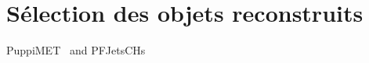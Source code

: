 \section{Sélection des objets reconstruits}\label{chapter-HTT_analysis-section-objects}

PuppiMET~\cite{PUPPI} and PFJetsCHs





